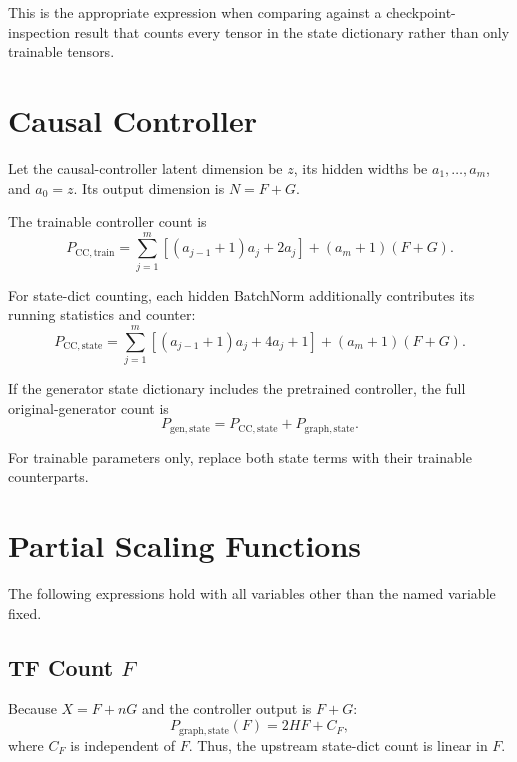 \documentclass[11pt]{article}
\begin{document}
This is the appropriate expression when comparing against a checkpoint-inspection result that
counts every tensor in the state dictionary rather than only trainable tensors.

\section{Causal Controller}

Let the causal-controller latent dimension be $z$, its hidden widths be
$a_1,\ldots,a_m$, and $a_0=z$. Its output dimension is $N=F+G$.

The trainable controller count is
\begin{equation}
P_{\mathrm{CC,train}}
=\sum_{j=1}^{m}\left[(a_{j-1}+1)a_j+2a_j\right]
+(a_m+1)(F+G).
\end{equation}

For state-dict counting, each hidden BatchNorm additionally contributes its running statistics and
counter:
\begin{equation}
P_{\mathrm{CC,state}}
=\sum_{j=1}^{m}\left[(a_{j-1}+1)a_j+4a_j+1\right]
+(a_m+1)(F+G).
\end{equation}

If the generator state dictionary includes the pretrained controller, the full original-generator
count is
\begin{equation}
\boxed{
P_{\mathrm{gen,state}}
=P_{\mathrm{CC,state}}+P_{\mathrm{graph,state}}.
}
\end{equation}

For trainable parameters only, replace both state terms with their trainable counterparts.

\section{Partial Scaling Functions}

The following expressions hold with all variables other than the named variable fixed.

\subsection{TF Count $F$}

Because $X=F+nG$ and the controller output is $F+G$:
\begin{equation}
\boxed{
P_{\mathrm{graph,state}}(F)
=2H F + C_F,
}
\end{equation}
where $C_F$ is independent of $F$. Thus, the upstream state-dict count is linear in $F$.
\end{document}
